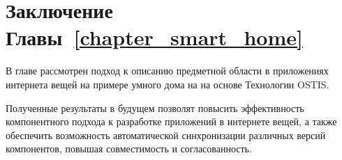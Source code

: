 \section*{Заключение Главы~\ref{chapter_smart_home}}
\label{sec_SH_plans_and_tasks}

В главе рассмотрен подход к описанию предметной области в приложениях интернета вещей на примере умного дома на на основе Технологии OSTIS.

Полученные результаты в будущем позволят повысить эффективность компонентного подхода к разработке приложений в интернете вещей, а также обеспечить возможность автоматической синхронизации различных версий компонентов, повышая совместимость и согласованность.